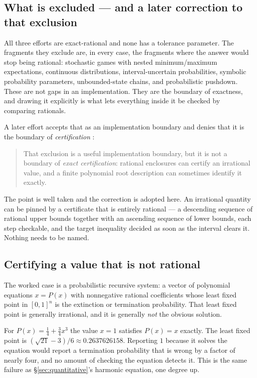 \subsection{What is excluded --- and a later correction to that exclusion}

All three efforts are exact-rational and none has a tolerance parameter. The
fragments they exclude are, in every case, the fragments where the answer would
stop being rational: stochastic games with nested minimum/maximum expectations,
continuous distributions, interval-uncertain probabilities, symbolic probability
parameters, unbounded-state chains, and probabilistic pushdown. These are not
gaps in an implementation. They are the boundary of exactness, and drawing it
explicitly is what lets everything inside it be checked by comparing rationals.

A later effort accepts that as an implementation boundary and denies that it is
the boundary of \emph{certification} :

\begin{quote}\small
That exclusion is a useful implementation boundary, but it is not a boundary of
\emph{exact certification}: rational enclosures can certify an irrational
value, and a finite polynomial root description can sometimes identify it
exactly.
\end{quote}

The point is well taken and the correction is adopted here. An irrational
quantity can be pinned by a certificate that is entirely rational --- a
descending sequence of rational upper bounds together with an ascending
sequence of lower bounds, each step checkable, and the target
inequality decided as soon as the interval clears it. Nothing needs to be named.

\subsection{Certifying a value that is not rational}

The worked case is a probabilistic recursive system: a vector of polynomial
equations $x=P(x)$ with nonnegative rational coefficients whose least fixed
point in $[0,1]^n$ is the extinction or termination probability. That least
fixed point is generally irrational, and it is generally \emph{not} the
obvious solution.

\begin{remark}
For $P(x)=\tfrac14+\tfrac34x^3$ the value $x=1$ satisfies $P(x)=x$ exactly.
The least fixed point is $(\sqrt{21}-3)/6\approx0.2637626158$. Reporting $1$
because it solves the equation would report a termination probability that is
wrong by a factor of nearly four, and no amount of checking the equation
detects it. This is the same failure as
\S\ref{sec:quantitative}'s harmonic equation, one degree up.
\end{remark}

